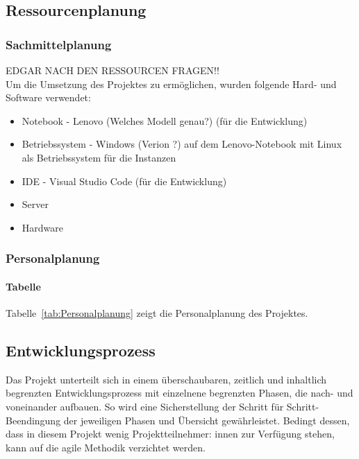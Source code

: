 \subsection{Ressourcenplanung}
\label{sec:Ressourcenplanung}

\subsubsection{Sachmittelplanung}
\label{sec:Sachmittelplanung}
EDGAR NACH DEN RESSOURCEN FRAGEN!!
\\Um die Umsetzung des Projektes zu ermöglichen, wurden folgende Hard- und Software verwendet:
\begin{itemize}
	\item Notebook - Lenovo (Welches Modell genau?) (für die Entwicklung)
	\item Betriebssystem - Windows (Verion ?) auf dem Lenovo-Notebook mit Linux als Betriebssystem für die Instanzen
	\item IDE - Visual Studio Code (für die Entwicklung)
	\item Server
	\item Hardware
\end{itemize}

\subsubsection{Personalplanung}
\label{sec:Personalplanung}
\paragraph{Tabelle}
Tabelle~\ref{tab:Personalplanung} zeigt die Personalplanung des Projektes.
\\

\subsection{Entwicklungsprozess}
\label{sec:Entwicklungsprozess}
Das Projekt unterteilt sich in einem überschaubaren, zeitlich und inhaltlich begrenzten Entwicklungsprozess 
mit einzelnene begrenzten Phasen, die nach- und voneinander aufbauen. So wird eine Sicherstellung der Schritt 
für Schritt-Beendingung der jeweiligen Phasen und Übersicht gewährleistet. Bedingt dessen, dass in diesem Projekt 
wenig Projektteilnehmer: innen zur Verfügung stehen, kann auf die agile Methodik verzichtet werden.
